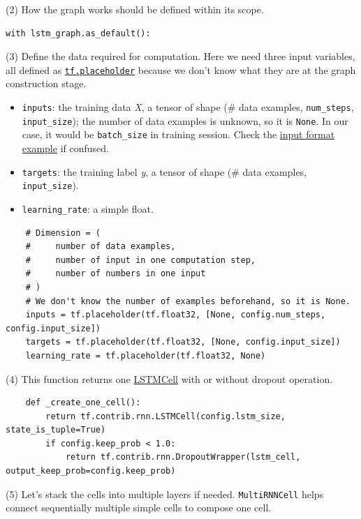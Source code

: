(2) How the graph works should be defined within its scope.

\begin{verbatim}
with lstm_graph.as_default():
\end{verbatim}

(3) Define the data required for computation. Here we need three input variables, all defined as \href{https://www.tensorflow.org/versions/master/api_docs/python/tf/placeholder}{\texttt{tf.placeholder}} because we don't know what they are at the graph construction stage.

\begin{itemize}
\tightlist
\item
  \texttt{inputs}: the training data \emph{X}, a tensor of shape (\# data examples, \texttt{num\_steps}, \texttt{input\_size}); the number of data examples is unknown, so it is \texttt{None}. In our case, it would be \texttt{batch\_size} in training session. Check the \hyperref[input_format_example]{input format example} if confused.
\item
  \texttt{targets}: the training label \emph{y}, a tensor of shape (\# data examples, \texttt{input\_size}).
\item
  \texttt{learning\_rate}: a simple float.
\end{itemize}

\begin{verbatim}
    # Dimension = (
    #     number of data examples, 
    #     number of input in one computation step, 
    #     number of numbers in one input
    # )
    # We don't know the number of examples beforehand, so it is None.
    inputs = tf.placeholder(tf.float32, [None, config.num_steps, config.input_size])
    targets = tf.placeholder(tf.float32, [None, config.input_size])
    learning_rate = tf.placeholder(tf.float32, None)
\end{verbatim}

(4) This function returns one \href{https://www.tensorflow.org/versions/r1.0/api_docs/python/tf/contrib/rnn/LSTMCell}{LSTMCell} with or without dropout operation.

\begin{verbatim}
    def _create_one_cell():
        return tf.contrib.rnn.LSTMCell(config.lstm_size, state_is_tuple=True)
        if config.keep_prob < 1.0:
            return tf.contrib.rnn.DropoutWrapper(lstm_cell, output_keep_prob=config.keep_prob)
\end{verbatim}

(5) Let's stack the cells into multiple layers if needed. \texttt{MultiRNNCell} helps connect sequentially multiple simple cells to compose one cell.


